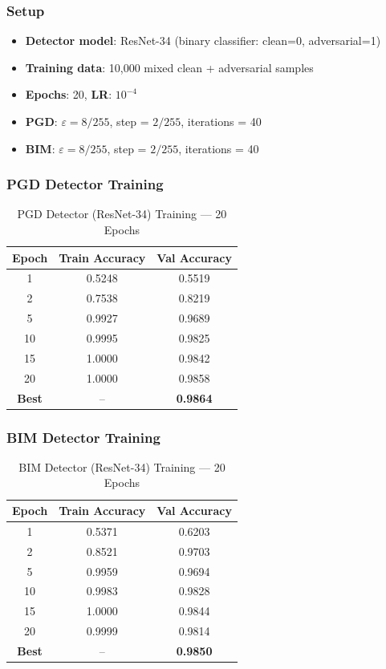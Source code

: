 \documentclass[12pt,a4paper]{article}
\begin{document}
\subsubsection{Setup}

\begin{itemize}
    \item \textbf{Detector model}: ResNet-34 (binary classifier: clean=0, adversarial=1)
    \item \textbf{Training data}: 10,000 mixed clean + adversarial samples
    \item \textbf{Epochs}: 20, \textbf{LR}: $10^{-4}$
    \item \textbf{PGD}: $\varepsilon = 8/255$, step = $2/255$, iterations = 40
    \item \textbf{BIM}: $\varepsilon = 8/255$, step = $2/255$, iterations = 40
\end{itemize}

\subsubsection{PGD Detector Training}

\begin{table}[H]
\centering
\caption{PGD Detector (ResNet-34) Training — 20 Epochs}
\begin{tabular}{ccc}
\toprule
Epoch & Train Accuracy & Val Accuracy \\
\midrule
1  & 0.5248 & 0.5519 \\
2  & 0.7538 & 0.8219 \\
5  & 0.9927 & 0.9689 \\
10 & 0.9995 & 0.9825 \\
15 & 1.0000 & 0.9842 \\
20 & 1.0000 & 0.9858 \\
\midrule
\textbf{Best} & -- & \textbf{0.9864} \\
\bottomrule
\end{tabular}
\end{table}

\subsubsection{BIM Detector Training}

\begin{table}[H]
\centering
\caption{BIM Detector (ResNet-34) Training — 20 Epochs}
\begin{tabular}{ccc}
\toprule
Epoch & Train Accuracy & Val Accuracy \\
\midrule
1  & 0.5371 & 0.6203 \\
2  & 0.8521 & 0.9703 \\
5  & 0.9959 & 0.9694 \\
10 & 0.9983 & 0.9828 \\
15 & 1.0000 & 0.9844 \\
20 & 0.9999 & 0.9814 \\
\midrule
\textbf{Best} & -- & \textbf{0.9850} \\
\bottomrule
\end{tabular}
\end{table}
\end{document}
